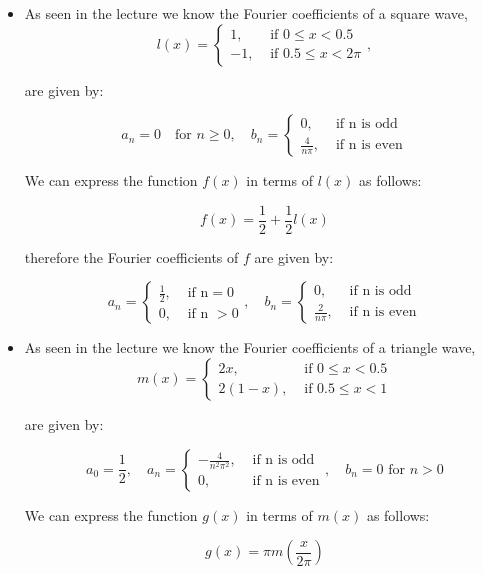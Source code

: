 \documentclass[11pt]{article}
\begin{document}
\begin{solution}     
    \begin{itemize}
    \item As seen in the lecture we know the Fourier coefficients of a square wave,
    $$
    l(x)= \begin{cases}1, & \text { if } 0 \leq x<0.5 \\ -1, & \text { if } 0.5 \leq x<2 \pi\end{cases},
    $$

    are given by:

    $$
    a_n = 0\quad \text{for } n \geq 0, \quad b_n = \begin{cases}0, & \text { if n is odd} \\ \frac{4}{n\pi}, & \text{ if n is even}\end{cases}
    $$

    We can express the function $f(x)$ in terms of $l(x)$ as follows:

    $$
    f(x) = \frac{1}{2} + \frac{1}{2}l(x)
    $$

    therefore the Fourier coefficients of $f$ are given by:

    $$
    a_n = \begin{cases}\frac{1}{2}, & \text { if n} = 0 \\0,& \text{ if n }>0\end{cases}, \quad b_n = \begin{cases}0, & \text { if n is odd} \\ \frac{2}{n\pi}, & \text{ if n is even}\end{cases}
    $$
    \item  As seen in the lecture we know the Fourier coefficients of a triangle wave,
    $$
    m(x)= \begin{cases}2 x, & \text { if } 0 \leq x<0.5 \\ 2(1-x), & \text { if } 0.5 \leq x<1\end{cases}
    $$

    are given by:

    $$
    a_0 = \frac{1}{2}, \quad a_n = \begin{cases}-\frac{4}{n^2\pi^2}, & \text { if n is odd} \\ 0, & \text{ if n is even}\end{cases}, \quad b_n = 0 \text{ for } n > 0
    $$

    We can express the function $g(x)$ in terms of $m(x)$ as follows:

    $$
    g(x) = \pi m(\frac{x}{2\pi})
    $$


\end{itemize}
\end{solution}
\end{document}
